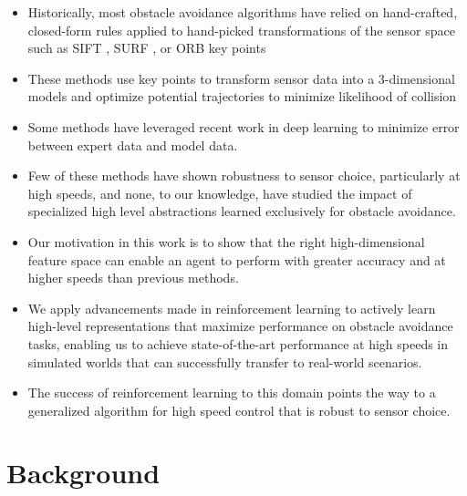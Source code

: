 \documentclass[paper=a4, fontsize=11pt]{scrartcl} %
\begin{document}
\begin{itemize}
	\item Historically, most obstacle avoidance algorithms have relied on hand-crafted, closed-form rules applied to hand-picked transformations of the sensor space such as SIFT \cite{lowe1999object}, SURF \cite{bay2006surf}, or ORB key points \cite{rublee2011orb}
	\item These methods use key points to transform sensor data into a 3-dimensional models and optimize potential trajectories to minimize likelihood of collision
	\item Some methods have leveraged recent work in deep learning to minimize error between expert data and model data.
	\item Few of these methods have shown robustness to sensor choice, particularly at high speeds, and none, to our knowledge, have studied the impact of specialized high level abstractions learned exclusively for obstacle avoidance.
\end{itemize}

\begin{itemize}	
	\item Our motivation in this work is to show that the right high-dimensional feature space can enable an agent to perform with greater accuracy and at higher speeds than previous methods.
	\item We apply advancements made in reinforcement learning to actively learn high-level representations that maximize performance on obstacle avoidance tasks, enabling us to achieve state-of-the-art performance at high speeds in simulated worlds that can successfully transfer to real-world scenarios.
	\item The success of reinforcement learning to this domain points the way to a generalized algorithm for high speed control that is robust to sensor choice.
\end{itemize}

\section{Background}
\end{document}
